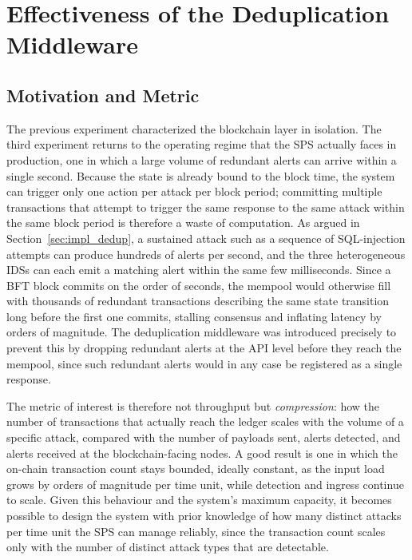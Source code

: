 \section{Effectiveness of the Deduplication Middleware}
\label{sec:exp_dedup}

\subsection{Motivation and Metric}

The previous experiment characterized the blockchain layer in isolation. The third experiment returns to the operating regime that the SPS actually faces in production, one in which a large volume of redundant alerts can arrive within a single second. Because the state is already bound to the block time, the system can trigger only one action per attack per block period; committing multiple transactions that attempt to trigger the same response to the same attack within the same block period is therefore a waste of computation. As argued in Section~\ref{sec:impl_dedup}, a sustained attack such as a sequence of SQL-injection attempts can produce hundreds of alerts per second, and the three heterogeneous IDSs can each emit a matching alert within the same few milliseconds. Since a BFT block commits on the order of seconds, the mempool would otherwise fill with thousands of redundant transactions describing the same state transition long before the first one commits, stalling consensus and inflating latency by orders of magnitude. The deduplication middleware was introduced precisely to prevent this by dropping redundant alerts at the API level before they reach the mempool, since such redundant alerts would in any case be registered as a single response.

The metric of interest is therefore not throughput but \emph{compression}: how the number of transactions that actually reach the ledger scales with the volume of a specific attack, compared with the number of payloads sent, alerts detected, and alerts received at the blockchain-facing nodes. A good result is one in which the on-chain transaction count stays bounded, ideally constant, as the input load grows by orders of magnitude per time unit, while detection and ingress continue to scale. Given this behaviour and the system's maximum capacity, it becomes possible to design the system with prior knowledge of how many distinct attacks per time unit the SPS can manage reliably, since the transaction count scales only with the number of distinct attack types that are detectable.

